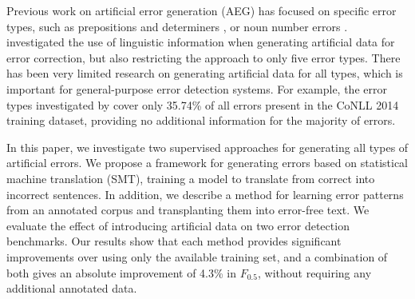 \documentclass[11pt,letterpaper]{article}
\begin{document}
Previous work on artificial error generation (AEG) has focused on specific error types, such as prepositions and determiners \cite{Rozovskaya2010a,Rozovskaya2011a}, or noun number errors \cite{Brockett2006}.
 investigated the use of linguistic information when generating artificial data for error correction, but also restricting the approach to only five error types. 
There has been very limited research on generating artificial data for all types, which is important for general-purpose error detection systems.
For example, the error types investigated by  cover only 35.74\% of all errors present in the CoNLL 2014 training dataset, providing no additional information for the majority of errors.

In this paper, we investigate two supervised approaches for generating all types of artificial errors.
We propose a framework for generating errors based on statistical machine translation (SMT), training a model to translate from correct into incorrect sentences. In addition, we describe a method for learning error patterns from an annotated corpus and transplanting them into error-free text. We evaluate the effect of introducing artificial data on two error detection benchmarks.
Our results show that each method provides significant improvements over using only the available training set, and a combination of both gives an absolute improvement of 4.3\% in $F_{0.5}$, without requiring any additional annotated data.
\end{document}
